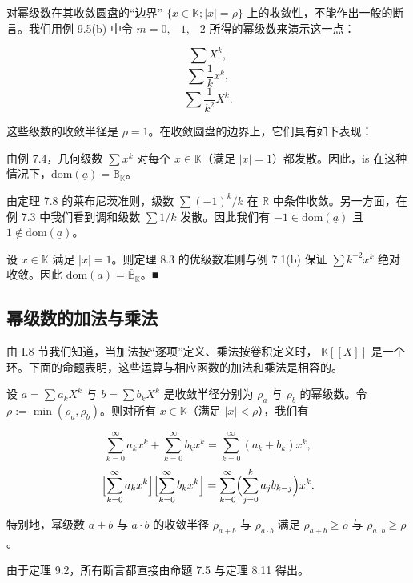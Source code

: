 \begin{remark}

对幂级数在其收敛圆盘的“边界”  $ \{x \in \mathbb{K} ; |x| = \rho\} $ 上的收敛性，不能作出一般的断言。我们用例 9.5(b) 中令  $ m = 0, -1, -2 $ 所得的幂级数来演示这一点：

\[
\sum X^{k},
\]
\[
\sum\frac{1}{k}x^{k},
\]
\[
\sum\frac{1}{k^{2}}X^{k}.
\]

这些级数的收敛半径是  $ \rho = 1 $。在收敛圆盘的边界上，它们具有如下表现：

\begin{subitems}
\item

由例 7.4，几何级数  $ \sum x^k $ 对每个  $ x \in \mathbb{K} $（满足  $ |x| = 1 $）都发散。因此，is 在这种情况下，$ \text{dom}(\underline{a}) = \mathbb{B}_{\mathbb{K}} $。

\item

由定理 7.8 的莱布尼茨准则，级数  $ \sum(-1)^k/k $ 在  $ \mathbb{R} $ 中条件收敛。另一方面，在例 7.3 中我们看到调和级数  $ \sum 1/k $ 发散。因此我们有  $ -1 \in \text{dom}(\underline{a}) $ 且  $ 1 \notin \text{dom}(\underline{a}) $。

\item

设  $ x \in \mathbb{K} $ 满足  $ |x| = 1 $。则定理 8.3 的优级数准则与例 7.1(b) 保证  $ \sum k^{-2}x^k $ 绝对收敛。因此  $ \mathrm{dom}(a) = \bar{\mathbb{B}}_{\mathbb{K}} $。■

\end{subitems}

\end{remark}

\subsection*{幂级数的加法与乘法}

由 I.8 节我们知道，当加法按“逐项”定义、乘法按卷积定义时，  $ \mathbb{K}[\![X]\!] $ 是一个环。下面的命题表明，这些运算与相应函数的加法和乘法是相容的。

\begin{proposition}

设  $ a = \sum a_k X^k $ 与  $ b = \sum b_k X^k $ 是收敛半径分别为  $ \rho_a $ 与  $ \rho_b $ 的幂级数。令  $ \rho := \min(\rho_a, \rho_b) $。则对所有  $ x \in \mathbb{K} $（满足  $ |x| < \rho $），我们有

\[
\sum_{k=0}^{\infty}a_{k}x^{k}+\sum_{k=0}^{\infty}b_{k}x^{k}=\sum_{k=0}^{\infty}(a_{k}+b_{k})x^{k},
\]
\[
\Bigl[\sum_{k=0}^{\infty}a_{k}x^{k}\Bigr]\Bigl[\sum_{k=0}^{\infty}b_{k}x^{k}\Bigr]=\sum_{k=0}^{\infty}\Bigl(\sum_{j=0}^{k}a_{j}b_{k-j}\Bigr)x^{k}.
\]

特别地，幂级数  $ a+b $ 与  $ a\cdot b $ 的收敛半径  $ \rho_{a+b} $ 与  $ \rho_{a\cdot b} $ 满足  $ \rho_{a+b} \geq \rho $ 与  $ \rho_{a\cdot b} \geq \rho $。

\proofhead
由于定理 9.2，所有断言都直接由命题 7.5 与定理 8.11 得出。
\end{proposition}

